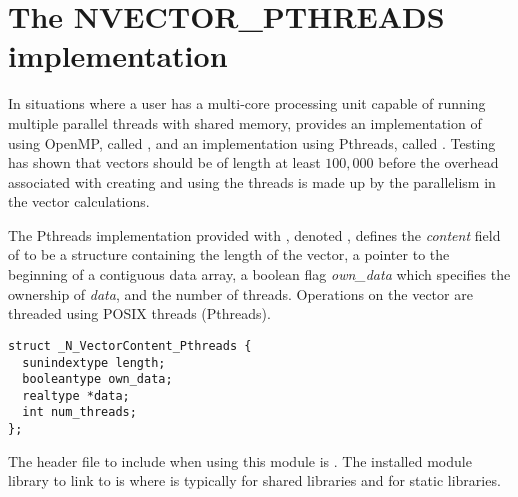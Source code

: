 \section{The NVECTOR\_PTHREADS implementation}\label{ss:nvec_pthreads}

In situations where a user has a multi-core processing unit capable of
running multiple parallel threads with shared memory, {\sundials} provides
an implementation of {\nvector} using OpenMP, called {\nvecopenmp}, and
an implementation using Pthreads, called {\nvecpthreads}.  
Testing has shown that vectors should be of length at least $100,000$ 
before the overhead associated with creating and using the threads is
made up by the parallelism in the vector calculations. 

The Pthreads {\nvector} implementation provided with {\sundials}, denoted
{\nvecpthreads}, defines the {\em content} field of  to be a structure 
containing the length of the vector, a pointer to the beginning of a contiguous 
data array, a boolean flag {\em own\_data} which specifies the ownership 
of {\em data}, and the number of threads.  
Operations on the vector are threaded using POSIX threads 
(Pthreads).
\begin{verbatim} 
struct _N_VectorContent_Pthreads {
  sunindextype length;
  booleantype own_data;
  realtype *data;
  int num_threads;
};
\end{verbatim}

The header file to include when using this module is .
The installed module library to link to is
where  is typically  for shared libraries and 
for static libraries.

